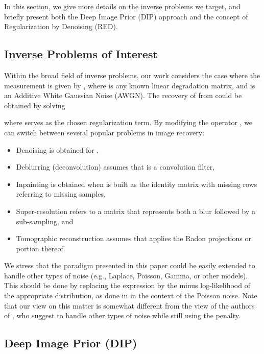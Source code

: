 \documentclass[12pt]{article}
\begin{document}
In this section, we give more details on the inverse problems we target, and briefly present both the Deep Image Prior (DIP) approach and the concept of Regularization by Denoising (RED). 



\subsection{Inverse Problems of Interest}
\label{subsec:IP}

Within the broad field of inverse problems, our work considers the case where the measurement  is given by 
, where  is any known linear degradation matrix, and  is an Additive White Gaussian Noise (AWGN). The recovery of  from  could be obtained by solving 

where  serves as the chosen regularization term. By modifying the operator , we can switch between several popular problems in image recovery: 
\begin{itemize}
\item Denoising is obtained for , 
\item Deblurring (deconvolution) assumes that  is a convolution filter, 
\item Inpainting is obtained when  is built as the identity matrix with missing rows referring to missing samples, 
\item Super-resolution refers to a matrix  that represents both a blur followed by a sub-sampling, and 
\item Tomographic reconstruction assumes that  applies the Radon projections or portion thereof. 
\end{itemize}

\noindent We stress that the paradigm presented in this paper could be easily extended to handle other types of noise (e.g., Laplace, Poisson, Gamma, or other models). This should be done by replacing the expression  by the minus log-likelihood of the appropriate distribution, as done in \cite{PoissonDenoising-2014,PoissonIP-2016, giryes2014sparsity} in the context of the Poisson noise. Note that our view on this matter is somewhat different from the view of the authors of \cite{DIP-2018}, who suggest to handle other types of noise while still using the  penalty. 



\subsection{Deep Image Prior (DIP)}
\label{subsec:DIP}
\end{document}
